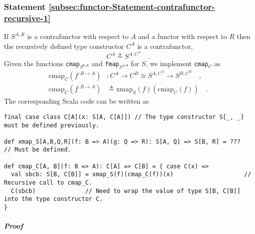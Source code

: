 \subsubsection{Statement \label{subsec:functor-Statement-contrafunctor-recursive-1}\ref{subsec:functor-Statement-contrafunctor-recursive-1}}

If $S^{A,R}$ is a contrafunctor with respect to $A$ and a functor
with respect to $R$ then the recursively defined type constructor
$C^{A}$ is a contrafunctor,
\[
C^{A}\triangleq S^{A,C^{A}}\quad.
\]
Given the functions \lstinline!cmap!$_{S^{\bullet,R}}$ and \lstinline!fmap!$_{S^{A,\bullet}}$
for $S$, we implement \lstinline!cmap!$_{C}$ as
\begin{align*}
\text{cmap}_{C}(f^{:B\rightarrow A}) & :C^{A}\rightarrow C^{B}\cong S^{A,C^{A}}\rightarrow S^{B,C^{B}}\quad,\\
\text{cmap}_{C}(f^{:B\rightarrow A}) & \triangleq\text{xmap}_{S}(f)(\overline{\text{cmap}_{C}}(f))\quad.
\end{align*}
The corresponding Scala code can be written as
\begin{lstlisting}
final case class C[A](x: S[A, C[A]]) // The type constructor S[_, _] must be defined previously.

def xmap_S[A,B,Q,R](f: B => A)(g: Q => R): S[A, Q] => S[B, R] = ???          // Must be defined.

def cmap_C[A, B](f: B => A): C[A] => C[B] = { case C(x) =>
  val sbcb: S[B, C[B]] = xmap_S(f)(cmap_C(f))(x)                    // Recursive call to cmap_C.
  C(sbcb)              // Need to wrap the value of type S[B, C[B]] into the type constructor C.
}
\end{lstlisting}


\subparagraph{Proof}

